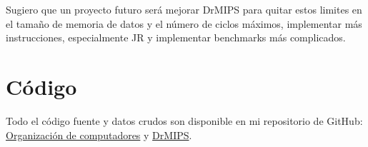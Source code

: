\documentclass[a4paper]{article}
\begin{document}
Sugiero que un proyecto futuro será mejorar DrMIPS para quitar estos limites en el tamaño de memoria de datos y el número de ciclos máximos, implementar más instrucciones, especialmente JR y implementar benchmarks más complicados.

\section{Código}

Todo el código fuente y datos crudos son disponible en mi repositorio de GitHub:  \href{https://github.com/andrewparlane/fiuba6620_orga_de_compus/tree/master/tpFinal}{Organización de computadores} y \href{https://github.com/andrewparlane/drmips}{DrMIPS}.
\end{document}
